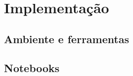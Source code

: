 \chapter{Implementação}
\label{cap:implementacao}

\section{Ambiente e ferramentas}

\section{Notebooks}


